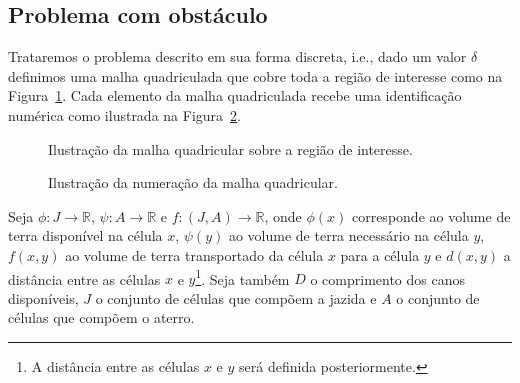 \subsection{Problema com obstáculo}
Trataremos o problema descrito em sua forma discreta, i.e., dado um valor
$\delta$ definimos uma malha quadriculada que cobre toda a regi\~{a}o de
interesse como na Figura~\ref{fig:malha_quad}. Cada elemento da malha
quadriculada recebe uma identificação numérica como ilustrada na
Figura~\ref{fig:malha_quad_num}.
\begin{figure}[!htb]
    \centering
    \caption{Ilustra\c{c}\~{a}o da malha quadricular sobre a regi\~{a}o de
    interesse.}
    \label{fig:malha_quad}
\end{figure}
\begin{figure}[!htb]
    \centering
    \caption{Ilustra\c{c}\~{a}o da numeração da malha quadricular.}
    \label{fig:malha_quad_num}
\end{figure}

Seja $\phi : J \to \mathbb{R}$, $\psi: A \to \mathbb{R}$ e $f: (J, A) \to \mathbb{R}$,
onde $\phi(x)$ corresponde ao volume de terra disponível na célula $x$, $\psi(y)$
ao volume de terra necessário na célula $y$, $f(x,y)$ ao volume de terra
transportado da célula $x$ para a célula $y$ e $d(x, y)$ a distância entre as
células $x$ e $y$\footnote{A distância entre as células $x$ e $y$ será definida
posteriormente.}. Seja também $D$ o comprimento dos canos disponíveis, $J$ o
conjunto de células que compõem a jazida e $A$ o conjunto de células que compõem
o aterro.

